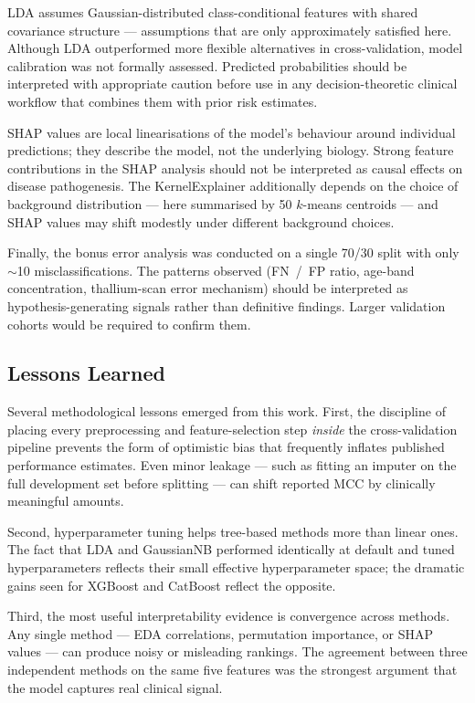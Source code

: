 LDA assumes Gaussian-distributed class-conditional features with shared covariance structure --- assumptions that are only approximately satisfied here. Although LDA outperformed more flexible alternatives in cross-validation, model calibration was not formally assessed. Predicted probabilities should be interpreted with appropriate caution before use in any decision-theoretic clinical workflow that combines them with prior risk estimates.

SHAP values are local linearisations of the model's behaviour around individual predictions; they describe the model, not the underlying biology. Strong feature contributions in the SHAP analysis should not be interpreted as causal effects on disease pathogenesis. The KernelExplainer additionally depends on the choice of background distribution --- here summarised by 50 $k$-means centroids --- and SHAP values may shift modestly under different background choices.

Finally, the bonus error analysis was conducted on a single 70/30 split with only $\sim$10 misclassifications. The patterns observed (FN~/~FP ratio, age-band concentration, thallium-scan error mechanism) should be interpreted as hypothesis-generating signals rather than definitive findings. Larger validation cohorts would be required to confirm them.

\subsection{Lessons Learned}

Several methodological lessons emerged from this work. First, the discipline of placing every preprocessing and feature-selection step \emph{inside} the cross-validation pipeline prevents the form of optimistic bias that frequently inflates published performance estimates. Even minor leakage --- such as fitting an imputer on the full development set before splitting --- can shift reported MCC by clinically meaningful amounts.

Second, hyperparameter tuning helps tree-based methods more than linear ones. The fact that LDA and GaussianNB performed identically at default and tuned hyperparameters reflects their small effective hyperparameter space; the dramatic gains seen for XGBoost and CatBoost reflect the opposite.

Third, the most useful interpretability evidence is convergence across methods. Any single method --- EDA correlations, permutation importance, or SHAP values --- can produce noisy or misleading rankings. The agreement between three independent methods on the same five features was the strongest argument that the model captures real clinical signal.

